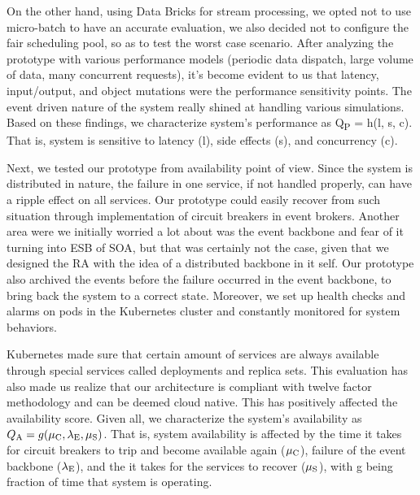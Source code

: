 \documentclass[runningheads]{llncs}
\begin{document}
On the other hand, using Data Bricks for stream processing, we opted not to use micro-batch to have an accurate evaluation, we also decided not to configure the fair scheduling pool, so as to test the worst case scenario. After analyzing the prototype with various performance models (periodic data dispatch, large volume of data, many concurrent requests), it's become evident to us that latency, input/output, and object mutations were the performance sensitivity points. The event driven nature of the system really shined at handling various simulations. Based on these findings, we characterize system's performance as  Q\textsubscript{P} = h(l, s, c). That is, system is sensitive to latency (l), side effects (s), and concurrency (c).

Next, we tested our prototype from availability point of view. Since the system is distributed in nature, the failure in one service, if not handled properly, can have a ripple effect on all services. Our prototype could easily recover from such situation through implementation of circuit breakers in event brokers. Another area were we initially worried a lot about was the event backbone and fear of it turning into ESB of SOA, but that was certainly not the case, given that we designed the RA with the idea of a distributed backbone in it self. Our prototype also archived the events before the failure occurred in the event backbone, to bring back the system to a correct state. Moreover, we set up health checks and alarms on pods in the Kubernetes cluster and constantly monitored for system behaviors. 

Kubernetes made sure that certain amount of services are always available through special services called deployments and replica sets. This evaluation has also made us realize that our architecture is compliant with twelve factor methodology and can be deemed cloud native. This has positively affected the availability score. Given all, we characterize the system's availability as $Q\textsubscript{A} = g(\mu\textsubscript{C}, \lambda\textsubscript{E}, \mu\textsubscript{S})$. That is, system availability is affected by the time it takes for circuit breakers to trip and become available again ($\mu\textsubscript{C}$), failure of the event backbone ($\lambda\textsubscript{E}$), and the it takes for the services to recover ($\mu\textsubscript{S}$), with g being fraction of time that system is operating.
\end{document}
